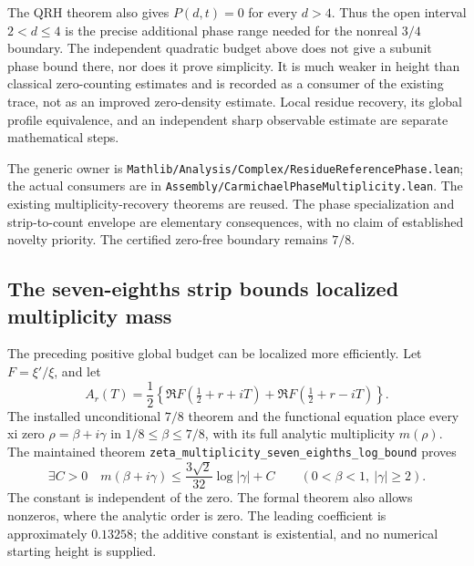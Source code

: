 The QRH theorem also gives \(P(d,t)=0\) for every \(d>4\).
Thus the open interval \(2<d\le4\) is the precise additional phase
range needed for the nonreal \(3/4\) boundary. The independent
quadratic budget above does not give a subunit phase bound there,
nor does it prove simplicity. It is much weaker in height than
classical zero-counting estimates and is recorded as a consumer
of the existing trace, not as an improved zero-density estimate.
Local residue recovery, its global profile equivalence, and an
independent sharp observable estimate are separate mathematical steps.

The generic owner is
\texttt{Mathlib/Analysis/Complex/ResidueReferencePhase.lean};
the actual consumers are in
\texttt{Assembly/CarmichaelPhaseMultiplicity.lean}.
The existing multiplicity-recovery theorems are reused.
The phase specialization and strip-to-count envelope are elementary
consequences, with no claim of established novelty priority.
The certified zero-free boundary remains \(7/8\).

\subsection{The seven-eighths strip bounds localized multiplicity mass}
\label{sec:localized-paired-multiplicity}

The preceding positive global budget can be localized more efficiently.
Let \(F=\xi'/\xi\), and let
\[
 A_r(T)=\frac12\left\{\Re F\left(\tfrac12+r+iT\right)
                   +\Re F\left(\tfrac12+r-iT\right)\right\}.
\]
The installed unconditional \(7/8\) theorem and the functional equation
place every xi zero \(\rho=\beta+i\gamma\) in
\(1/8\le\beta\le7/8\), with its full analytic multiplicity \(m(\rho)\).
The maintained theorem
\texttt{zeta\_multiplicity\_seven\_eighths\_log\_bound} proves
\begin{equation}\label{eq:localized-multiplicity-log-bound}
 \exists C>0\quad
 m(\beta+i\gamma)\le\frac{3\sqrt2}{32}\log|\gamma|+C
 \qquad(0<\beta<1,\ |\gamma|\ge2).
\end{equation}
The constant is independent of the zero. The formal theorem also allows
nonzeros, where the analytic order is zero. The leading coefficient is
approximately \(0.13258\); the additive constant is existential, and no
numerical starting height is supplied.

